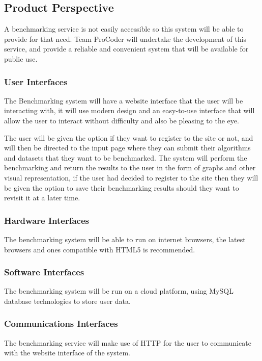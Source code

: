 \documentclass[runningheads,a4paper]{article}
\begin{document}
	\subsection{Product Perspective}
		A benchmarking service is not easily accessible so this system will be able to provide for that need. Team ProCoder will undertake the development of this service, and provide a reliable and convenient system that will be available for public use. \newline
		
		\subsubsection{User Interfaces}
			The Benchmarking system will have a website interface that the user will be interacting with, it will use modern design and an easy-to-use interface that will allow the user to interact without difficulty and also be pleasing to the eye. \newline
			\begin{flushleft}
			The user will be given the option if they want to register to the site or not, and will then be directed to the input page where they can submit their algorithms and datasets that they want to be benchmarked. The system will perform the benchmarking and return the results to the user in the form of graphs and other visual representation, if the user had decided to register to the site then they will be given the option to save their benchmarking results should they want to revisit it at a later time.
			\end{flushleft}
			\newline
			
		\subsubsection{Hardware Interfaces}
			The benchmarking system will be able to run on internet browsers, the latest browsers and ones compatible with HTML5 is recommended. \newline
			
		\subsubsection{Software Interfaces}
			The benchmarking system will be run on a cloud platform, using MySQL database technologies to store user data. \newline
			
		\subsubsection{Communications Interfaces}
			The benchmarking service will make use of HTTP for the user to communicate with the website interface of the system. \newline
			
\end{document}
